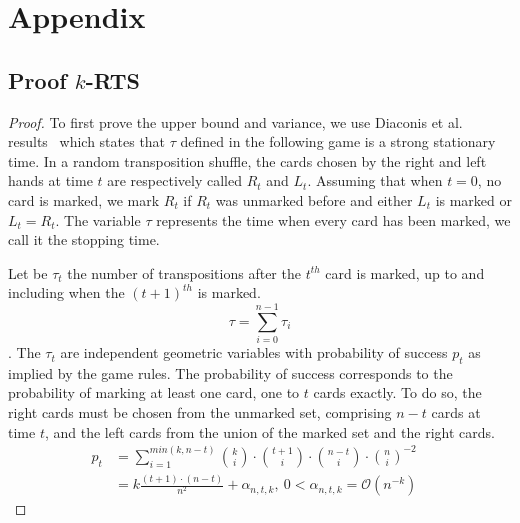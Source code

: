 \documentclass{llncs}
\begin{document}



\section{Appendix}
\subsection{Proof $k$-RTS}
\begin{proof}
To first prove the upper bound and variance, we use Diaconis et al. results~\cite{aldous1986shuffling} which states that $\tau$ defined in the following game is a strong stationary time.
In a random transposition shuffle, the cards chosen by the right and left hands at time $t$ are respectively called $R_t$ and $L_t$. Assuming that when $t=0$, no card is marked, we mark $R_t$ if
$R_t$ was unmarked before and either $L_t$ is marked or $L_t = R_t$. The variable $\tau$ represents the time when every card has been marked, we call it the stopping time.

Let be $\tau_t$ the number of transpositions after the $t^{th}$ card is marked, up to and including when the $(t+1)^{th}$ is marked. $$\tau = \sum_{i=0}^{n-1} \tau_i$$.
The $\tau_t$ are independent geometric variables with probability of success $p_t$ as implied by the game rules.
The probability of success corresponds to the probability of marking at least one card, one to $t$ cards exactly. To do so, the right cards must be chosen from the unmarked set, comprising $n-t$ cards at time $t$,
and the left cards from the union of the marked set and the right cards.
\begin{align*}
 p_t &= \sum_{i=1}^{min(k,n-t)} {k \choose i} \cdot {t+1 \choose i} \cdot {n-t \choose i}\cdot{n \choose i}^{-2}&\\
 &= k \frac{(t+1)\cdot(n-t)}{n^2} + \alpha_{n,t,k},\ 0 < \alpha_{n,t,k} = \mathcal{O}\left(n^{-k}\right )
\end{align*}


\end{proof}
\end{document}
